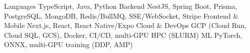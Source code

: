 \begin{cvskills}
  \cvskill
    {Languages}
    {TypeScript, Java, Python}
  \cvskill
    {Backend}
    {NestJS, Spring Boot, Prisma, PostgreSQL, MongoDB, Redis/BullMQ, SSE/WebSocket, Stripe}
  \cvskill
    {Frontend \& Mobile}
    {Next.js, React, React Native/Expo}
  \cvskill
    {Cloud \& DevOps}
    {GCP (Cloud Run, Cloud SQL, GCS), Docker, CI/CD, multi-GPU HPC (SLURM)}
  \cvskill
    {ML}
    {PyTorch, ONNX, multi-GPU training (DDP, AMP)}
\end{cvskills}
